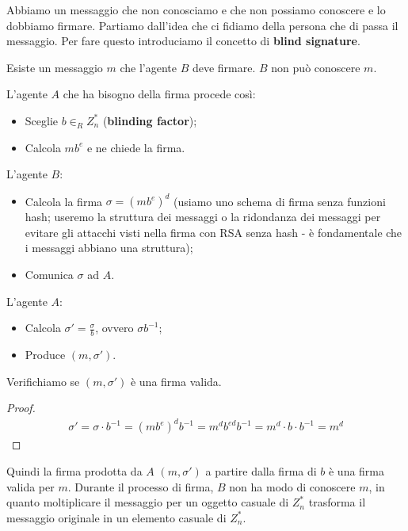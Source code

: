 Abbiamo un messaggio che non conosciamo e che non possiamo conoscere e lo dobbiamo firmare. Partiamo dall'idea che ci fidiamo della persona che di passa il messaggio. Per fare questo introduciamo il concetto di \textbf{blind signature}.

\begin{definition}
    Esiste un messaggio $m$ che l'agente $B$ deve firmare. $B$ non può conoscere $m$.
\end{definition}

\noindent L'agente $A$ che ha bisogno della firma procede così:
\begin{itemize}
    \item Sceglie $b \in_R Z_n^*$ (\textbf{blinding factor});
    \item Calcola $mb^e$ e ne chiede la firma.
\end{itemize}

\noindent L'agente $B$:
\begin{itemize}
    \item Calcola la firma $\sigma = (mb^e)^d$ (usiamo uno schema di firma senza funzioni hash; useremo la struttura dei messaggi o la ridondanza dei messaggi per evitare gli attacchi visti nella firma con RSA senza hash - è fondamentale che i messaggi abbiano una struttura);
    \item Comunica $\sigma$ ad $A$.
\end{itemize}

\noindent L'agente $A$:
\begin{itemize}
    \item Calcola $\sigma' = \frac{\sigma}{b}$, ovvero $\sigma b^{-1}$;
    \item Produce $(m, \sigma')$.
\end{itemize}

\noindent Verifichiamo se $(m, \sigma')$ è una firma valida.
\begin{proof}
    \begin{align*}
        \sigma' = \sigma \cdot b^{-1} = (mb^e)^d b^{-1} = m^d b^{ed} b^{-1} = m^d \cdot b \cdot b^{-1} = m^d
    \end{align*}
\end{proof}

\noindent Quindi la firma prodotta da $A$ $(m, \sigma')$ a partire dalla firma di $b$ è una firma valida per $m$. Durante il processo di firma, $B$ non ha modo di conoscere $m$, in quanto moltiplicare il messaggio per un oggetto casuale di $Z_n^*$ trasforma il messaggio originale in un elemento casuale di $Z_n^*$.\\

